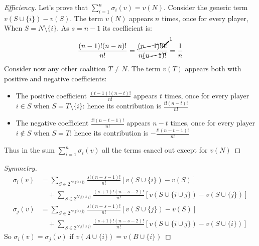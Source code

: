 \documentclass[../main.tex]{subfiles}
\begin{document}
\begin{proof}[Efficiency]
    Let's prove that $\sum_{i=1}^n \sigma_i(v) = v(N)$. Consider the generic term $v(S \cup \{i\}) - v(S)$. The term $v(N)$ appears $n$ times, once for every player, When $S = N \setminus \{i\}$. As $s = n-1$ its coefficient is:
    \[
        \frac{(n-1)!(n-n)!}{n!} = \frac{\cancel{(n-1)!}\cancelto{1}{0!}}{n\cancel{(n-1)!}} = \frac{1}{n}
    \]
    Consider now any other coalition $T \neq N$. The term $v(T)$ appears both with positive and negative coefficients:
    \begin{itemize}
        \item The positive coefficient $\frac{(t-1)!(n-t)!}{n!}$ appears $t$ times, once for every player $i \in S$ when $S = T \setminus \{i\}$: hence its contribution is $\frac{t!(n-t)!}{n!}$
        \item The negative coefficient $\frac{t!(n-t-1)!}{n!}$ appears $n-t$ times, once for every player $i \notin S$ when $S = T$: hence its contribution is $-\frac{t!(n-t-1)!}{n!}$
    \end{itemize}
    Thus in the sum $\sum_{i=1}^n \sigma_i(v)$ all the terms cancel out except for $v(N)$
\end{proof}
\begin{proof}[Symmetry]
    \begin{align*}
        \sigma_i(v) & = \sum_{S \in 2^{N \setminus \{i\cup j\}}} \frac{s!(n-s-1)!}{n!} [v(S \cup \{i\}) - v(S)]                             \\
                    & \quad + \sum_{S \in 2^{N \setminus \{i\cup j\}}} \frac{(s+1)!(n-s-2)!}{n!} [v(S \cup \{i \cup j\}) - v(S \cup \{j\})] \\
        \sigma_j(v) & = \sum_{S \in 2^{N \setminus \{i\cup j\}}} \frac{s!(n-s-1)!}{n!} [v(S \cup \{j\}) - v(S)]                             \\
                    & \quad + \sum_{S \in 2^{N \setminus \{i\cup j\}}} \frac{(s+1)!(n-s-2)!}{n!} [v(S \cup \{i \cup j\}) - v(S \cup \{i\})]
    \end{align*}
    So $\sigma_i(v) = \sigma_j(v)$ if $v(A \cup \{i\}) = v(B \cup \{i\})$
\end{proof}
\end{document}
